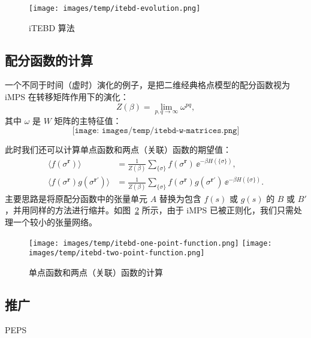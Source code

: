 \begin{figure}[htb]
  \centering
  \texttt{[image: images/temp/itebd-evolution.png]}
  \caption{iTEBD 算法}
  \label{fig:itebd-evolution}
\end{figure}

\subsection{配分函数的计算}
\label{subsec:partition-function}

一个不同于时间（虚时）演化的例子，是把二维经典格点模型的配分函数视为 iMPS 在转移矩阵作用下的演化：
\begin{equation}
  Z(\beta) = \lim_{p,q\to\infty} \omega^{pq},
\end{equation}
其中 $\omega$ 是 $W$ 矩阵的主特征值：
\begin{equation}
  \texttt{[image: images/temp/itebd-w-matrices.png]}
\end{equation}

此时我们还可以计算单点函数和两点（关联）函数的期望值：
\begin{equation}
  \begin{aligned}
    \langle f(\sigma^{\bm{r}}) \rangle
      &= \frac{1}{Z(\beta)} \sum_{\{\sigma\}} f(\sigma^{\bm{r}}) \, \ee^{-\beta H(\{\sigma\})}, \\
    \langle f(\sigma^{\bm{r}}) g(\sigma^{\bm{r}'}) \rangle
      &= \frac{1}{Z(\beta)} \sum_{\{\sigma\}} f(\sigma^{\bm{r}}) g(\sigma^{\bm{r}'}) \, \ee^{-\beta H(\{\sigma\})}.
  \end{aligned}
\end{equation}
主要思路是将原配分函数中的张量单元 $A$ 替换为包含 $f(s)$ 或 $g(s)$ 的 $B$ 或 $B'$，并用同样的方法进行缩并。如图~\ref{fig:expectation-value} 所示，由于 iMPS 已被正则化，我们只需处理一个较小的张量网络。

\begin{figure}[htb]
  \centering
  \texttt{[image: images/temp/itebd-one-point-function.png]} \quad
  \texttt{[image: images/temp/itebd-two-point-function.png]}
  \caption{单点函数和两点（关联）函数的计算}
  \label{fig:expectation-value}
\end{figure}

\subsection{推广}

PEPS

